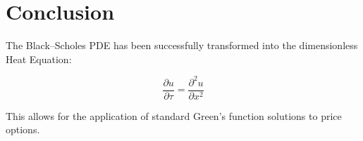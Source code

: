\documentclass[11pt,a4paper]{article}
\begin{document}
\section{Conclusion}
The Black--Scholes PDE has been successfully transformed into the dimensionless Heat Equation:

\begin{mdframed}[linecolor=navyblue, linewidth=1.5pt]
\begin{equation}
\frac{\partial u}{\partial \tau} = \frac{\partial^2 u}{\partial x^2}
\end{equation}
\end{mdframed}

This allows for the application of standard Green's function solutions to price options.
\end{document}
